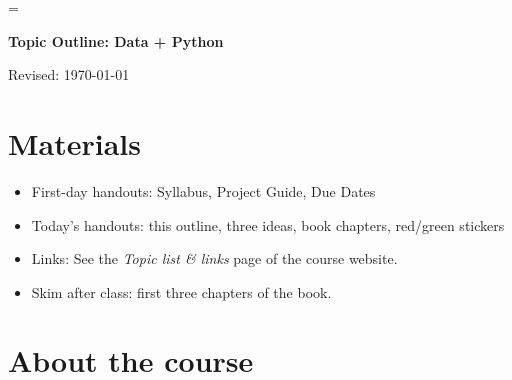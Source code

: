 \documentclass[11pt]{article}
\begin{document}
\parskip=\bigskipamount
\parindent=0.0in
\thispagestyle{empty}


\bigskip\bigskip
\centerline{\Large \bf Topic Outline:  Data + Python}
\centerline{Revised: \today}


\section*{Materials}

\begin{itemize}
\item  First-day handouts:  Syllabus, Project Guide, Due Dates
\item  Today's handouts:  this outline, three ideas, book chapters, red/green stickers 
\item  Links:  See the {\it Topic list \& links\/} page of the course website.
\item  Skim after class:  first three chapters of the book.
\end{itemize}



\section*{About the course}
\end{document}
